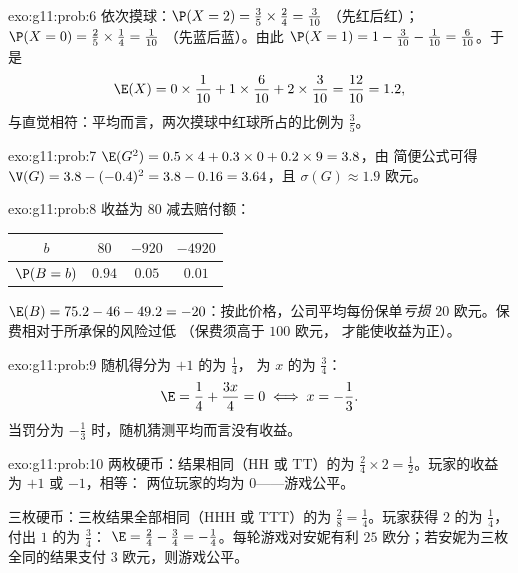 \begin{solution}{exo:g11:prob:6}
依次摸球：$\P(X = 2) = \frac35 \times \frac24 = \frac{3}{10}$
（先红后红）；$\P(X = 0) = \frac25 \times \frac14 = \frac{1}{10}$
（先蓝后蓝）。由此
$\P(X = 1) = 1 - \frac{3}{10} - \frac{1}{10} = \frac{6}{10}$。于是
\[
\E(X) = 0 \times \frac1{10} + 1 \times \frac6{10} + 2 \times \frac3{10}
= \frac{12}{10} = 1.2 ,
\]
与直觉相符：平均而言，两次摸球中红球所占的比例为 $\frac35$。
\end{solution}

\begin{solution}{exo:g11:prob:7}
$\E(G^2) = 0.5 \times 4 + 0.3 \times 0 + 0.2 \times 9 = 3.8$，由
简便公式可得
$\V(G) = 3.8 - (-0.4)^2 = 3.8 - 0.16 = 3.64$，且
$\sigma(G) \approx 1.9$ 欧元。
\end{solution}

\begin{solution}{exo:g11:prob:8}
收益为 $80$ 减去赔付额：
\begin{center}
\begin{tabular}{c|ccc}
$b$ & $80$ & $-920$ & $-4920$\\
\hline
$\P(B=b)$ & $0.94$ & $0.05$ & $0.01$
\end{tabular}
\end{center}
$\E(B) = 75.2 - 46 - 49.2 = -20$：按此价格，公司平均每份保单\emph{亏损}
$20$ 欧元。保费相对于所承保的风险过低
（保费须高于 $100$ 欧元，
才能使收益为正）。
\end{solution}

\begin{solution}{exo:g11:prob:9}
随机得分为 $+1$ 的为 $\frac14$，
为 $x$ 的为 $\frac34$：
\[
\E = \frac14 + \frac{3x}{4} = 0 \iff x = -\frac13 .
\]
当罚分为 $-\frac13$ 时，随机猜测平均而言没有收益。
\end{solution}

\begin{solution}{exo:g11:prob:10}
两枚硬币：结果相同（HH 或 TT）的为 $\frac24 \times 2 =
\frac12$。玩家的收益为 $+1$ 或 $-1$，相等：
两位玩家的均为 $0$——游戏公平。

三枚硬币：三枚结果全部相同（HHH 或 TTT）的为 $\frac{2}{8} =
\frac14$。玩家获得 $2$ 的为 $\frac14$，
付出 $1$ 的为 $\frac34$：
$\E = \frac24 - \frac34 = -\frac14$。每轮游戏对安妮有利
$25$ 欧分；若安妮为三枚全同的结果支付 $3$ 欧元，则游戏公平。
\end{solution}

